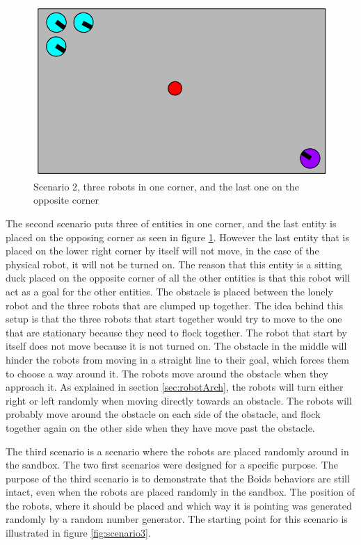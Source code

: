 \begin{figure}[h]
\begin{center}
\includegraphics[width=0.8\linewidth]{figs/scenario1}
\end{center}
\caption[scenario 2]{Scenario 2, three robots in one corner, and the last one on the opposite corner}
\label{fig:scenario2}
\end{figure}

The second scenario puts three of entities in one corner, and the last entity is placed on the opposing corner as seen in figure \ref{fig:scenario2}. However the last entity that is placed on the lower right corner by itself will not move, in the case of the physical robot, it will not be turned on. The reason that this entity is a sitting duck placed on the opposite corner of all the other entities is that this robot will act as a goal for the other entities. The obstacle is placed between the lonely robot and the three robots that are clumped up together. The idea behind this setup is that the three robots that start together would try to move to the one that are stationary because they need to flock together. The robot that start by itself does not move because it is not turned on.
The obstacle in the middle will hinder the robots from moving in a straight line to their goal, which forces them to choose a way around it. The robots move around the obstacle when they approach it. As explained in section \ref{sec:robotArch}, the robots will turn either right or left randomly when moving directly towards an obstacle. The robots will probably move around the obstacle on each side of the obstacle, and flock together again on the other side when they have move past the obstacle.

The third scenario is a scenario where the robots are placed randomly around in the sandbox. The two first scenarios were designed for a specific purpose. The purpose of the third scenario is to demonstrate that the Boids behaviors are still intact, even when the robots are placed randomly in the sandbox. The position of the robots, where it should be placed and which way it is pointing was generated randomly by a random number generator. The starting point for this scenario is illustrated in figure \ref{fig:scenario3}. 

